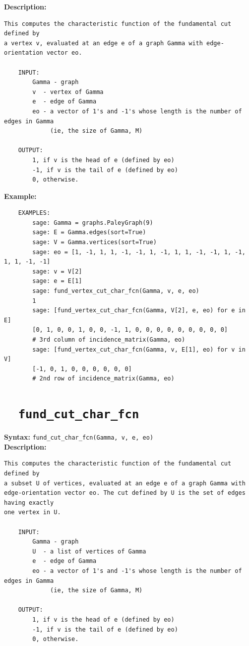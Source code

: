 \documentclass{article}
\begin{document}
\textbf{Description:}
\begin{verbatim}
This computes the characteristic function of the fundamental cut defined by 
a vertex v, evaluated at an edge e of a graph Gamma with edge-orientation vector eo. 

    INPUT:
        Gamma - graph
        v  - vertex of Gamma
        e  - edge of Gamma  
        eo - a vector of 1's and -1's whose length is the number of edges in Gamma
             (ie, the size of Gamma, M)

    OUTPUT:
        1, if v is the head of e (defined by eo)
        -1, if v is the tail of e (defined by eo)
        0, otherwise.
\end{verbatim}

\textbf{Example:}
\begin{verbatim}
    EXAMPLES:
        sage: Gamma = graphs.PaleyGraph(9)
        sage: E = Gamma.edges(sort=True)
        sage: V = Gamma.vertices(sort=True)
        sage: eo = [1, -1, 1, 1, -1, -1, 1, -1, 1, 1, -1, -1, 1, -1, 1, 1, -1, -1]
        sage: v = V[2]
        sage: e = E[1]
        sage: fund_vertex_cut_char_fcn(Gamma, v, e, eo)
        1
        sage: [fund_vertex_cut_char_fcn(Gamma, V[2], e, eo) for e in E]
        [0, 1, 0, 0, 1, 0, 0, -1, 1, 0, 0, 0, 0, 0, 0, 0, 0, 0]
        # 3rd column of incidence_matrix(Gamma, eo)
        sage: [fund_vertex_cut_char_fcn(Gamma, v, E[1], eo) for v in V]
        [-1, 0, 1, 0, 0, 0, 0, 0, 0]
        # 2nd row of incidence_matrix(Gamma, eo)
\end{verbatim}

\section{\tt \ \ fund\_cut\_char\_fcn}

\textbf{Syntax:} \verb}fund_cut_char_fcn(Gamma, v, e, eo)}\\

\textbf{Description:}
\begin{verbatim}
This computes the characteristic function of the fundamental cut defined by 
a subset U of vertices, evaluated at an edge e of a graph Gamma with 
edge-orientation vector eo. The cut defined by U is the set of edges having exactly 
one vertex in U.

    INPUT:
        Gamma - graph
        U  - a list of vertices of Gamma
        e  - edge of Gamma  
        eo - a vector of 1's and -1's whose length is the number of edges in Gamma
             (ie, the size of Gamma, M)

    OUTPUT:
        1, if v is the head of e (defined by eo)
        -1, if v is the tail of e (defined by eo)
        0, otherwise.
\end{verbatim}
\end{document}
